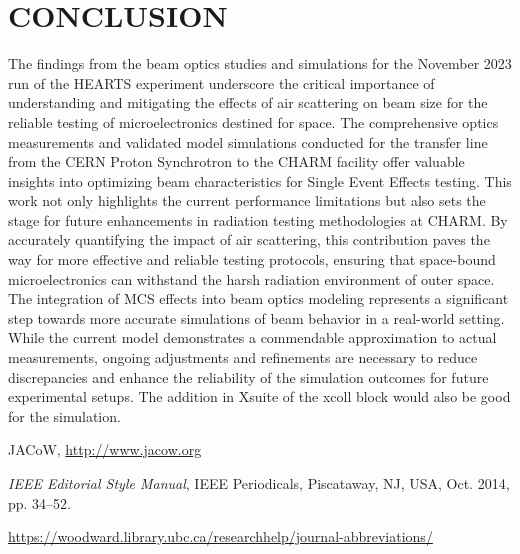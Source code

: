 \documentclass[a4paper,
               biblatex,     %
               ]{jacow}
\begin{document}
\section{CONCLUSION}

The findings from the beam optics studies and simulations for the November 2023 run of the HEARTS experiment underscore the critical importance of understanding and mitigating the effects of air scattering on beam size for the reliable testing of microelectronics destined for space. The comprehensive optics measurements and validated model simulations conducted for the transfer line from the CERN Proton Synchrotron to the CHARM facility offer valuable insights into optimizing beam characteristics for Single Event Effects testing. This work not only highlights the current performance limitations but also sets the stage for future enhancements in radiation testing methodologies at CHARM. By accurately quantifying the impact of air scattering, this contribution paves the way for more effective and reliable testing protocols, ensuring that space-bound microelectronics can withstand the harsh radiation environment of outer space. The integration of MCS effects into beam optics modeling represents a significant step towards more accurate simulations of beam behavior in a real-world setting. While the current model demonstrates a commendable approximation to actual measurements, ongoing adjustments and refinements are necessary to reduce discrepancies and enhance the reliability of the simulation outcomes for future experimental setups. The addition in Xsuite of the xcoll block would also be good for the simulation.

%
	{\printbibliography}%
	{%
	
	\begin{thebibliography}{9} %
	
		JACoW,
		\url{http://www.jacow.org}
	
		\textit{IEEE Editorial Style Manual},
		IEEE Periodicals, Piscataway,
		NJ, USA, Oct. 2014, pp. 34--52.

	\url{https://woodward.library.ubc.ca/researchhelp/journal-abbreviations/}

	\end{thebibliography}
} %
\end{document}
